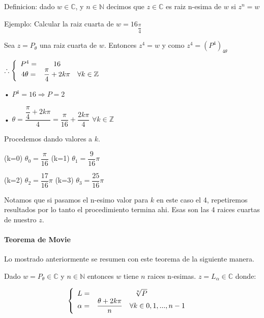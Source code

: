 Definicion: dado $w \in \mathbb{C}$, y $n \in \mathbb{N}$ decimos que $z \in \mathbb{C}$ es raiz n-esima de $w$ si $z^n=w$

Ejemplo: Calcular la raiz cuarta de $w=16_{\dfrac{\pi}{4}}$

\quad Sea $z=P_\theta$ una raiz cuarta de $w$. Entonces $z^4=w$ y como $z^4=(P^4)_{4\theta}$ 

\quad $\therefore \left\{ \begin{array}{c c c}
P^4 = & 16 & \\
4\theta = & \dfrac{\pi}{4} +2k\pi & \forall k \in \mathbb{Z}\\
\end{array}\right.$


\qquad • $P^4 =16 \Rightarrow P=2$

\qquad • $\theta = \dfrac{\dfrac{\pi}{4} +2k\pi}{4}= \dfrac{\pi}{16}+\dfrac{2k\pi}{4}$ \quad $\forall k \in \mathbb{Z}$


Procedemos dando valores a $k$.

(k=0) $\theta _0 =\dfrac{\pi}{16}$ \quad (k=1) $\theta _1 = \dfrac{9}{16} \pi$

(k=2) $\theta _2=\dfrac{17}{16} \pi$ \quad (k=3) $\theta _3=\dfrac{25}{16} \pi$

Notamos que si pasamos el n-esimo valor para $k$ en este caso el 4, repetiremos resultados por lo tanto el procedimiento termina ahi. Esas son las 4 raices cuartas de nuestro $z$.

\paragraph{Teorema de Movie} Lo mostrado anteriormente se resumen con este teorema de la siguiente manera.

Dado $w=P_\theta \in \mathbb{C}$ y $n \in \mathbb{N}$ entonces $w$ tiene $n$ raices n-esimas. $z=L_\alpha \in \mathbb{C}$ donde:

$$\left\{ \begin{array}{c c c}
L= & \sqrt[n]{P} &\\
\alpha = & \dfrac{\theta+2k\pi}{n} \quad \forall k \in {0,1,...,n-1} \\

\end{array} \right.$$





